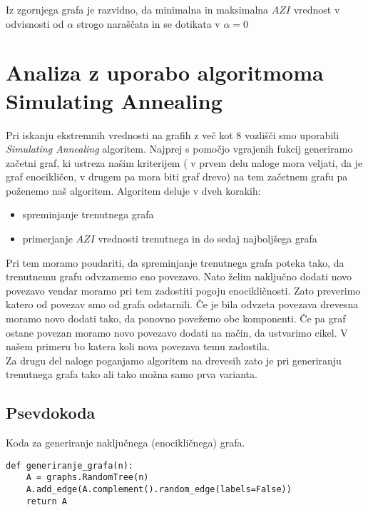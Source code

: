 \documentclass[11pt]{article} %
\begin{document}
Iz zgornjega grafa je razvidno, da minimalna in maksimalna $AZI$ vrednost v odvisnosti od $\alpha$ strogo naraščata in se dotikata v $\alpha = 0$ 


\section{Analiza z uporabo algoritmoma Simulating Annealing}
Pri iskanju ekstremnih vrednosti na grafih z več kot 8 vozlišči smo uporabili \textit{Simulating Annealing} algoritem. Najprej s pomočjo vgrajenih fukcij generiramo začetni graf, ki ustreza našim kriterijem ( v prvem delu naloge mora veljati, da je graf enocikličen, v drugem pa mora biti graf drevo) na tem začetnem grafu pa poženemo naš algoritem. Algoritem deluje v dveh korakih:
\begin{itemize}
\item{spreminjanje trenutnega grafa}
\item{primerjanje $AZI$ vrednosti trenutnega in do sedaj najboljšega grafa}
\end{itemize}
Pri tem moramo poudariti, da spreminjanje trenutnega grafa poteka tako, da trenutnemu grafu odvzamemo eno povezavo. Nato želim naključno dodati novo povezavo vendar moramo pri tem zadostiti pogoju enocikličnosti. Zato preverimo katero od povezav smo od grafa odstarnili. Če je bila odvzeta povezava drevesna moramo novo dodati tako, da ponovno povežemo obe komponenti. Če pa graf ostane povezan moramo novo povezavo dodati na način, da ustvarimo cikel. V našem primeru bo katera koli nova povezava temu zadostila.\\
Za drugu del naloge poganjamo algoritem na drevesih zato je pri generiranju trenutnega grafa tako ali tako možna samo prva varianta. 

\subsection{Psevdokoda}

Koda za generiranje naključnega (enocikličnega) grafa.
\begin{lstlisting}
def generiranje_grafa(n):
    A = graphs.RandomTree(n)
    A.add_edge(A.complement().random_edge(labels=False))
    return A
\end{lstlisting}
\end{document}
